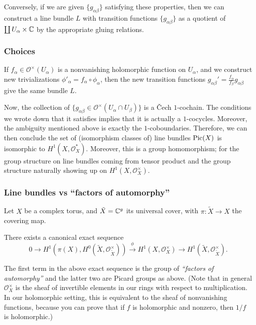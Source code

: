 Conversely, if we are given $\{g_{\alpha\beta}\}$ satisfying these properties, then we can construct a line bundle $L$ with transition functions $\{g_{\alpha\beta}\}$ as a quotient of $\coprod U_\alpha\times {\mathbb C}$ by the appropriate gluing relations. 

\subsubsection{Choices}
If $f_\alpha\in\mathcal{O}^\times(U_\alpha)$ is a nonvanishing holomorphic function on $U_\alpha$, and we construct new trivializations $\phi'_\alpha=f_\alpha\circ \phi_\alpha$, then the new transition functions $g_{\alpha\beta}'=\frac{f_\alpha}{f_\beta}g_{\alpha\beta}$
give the same bundle $L$. 

Now, the collection of $\{g_{\alpha\beta}\in \mathcal{O}^\times (U_\alpha\cap U_\beta)\}$ is a \v{C}ech $1$-cochain. The conditions we wrote down that it satisfies implies that it is actually a $1$-cocycles. Moreover, the ambiguity mentioned above is exactly the $1$-coboundaries. Therefore, we can then conclude the set of (isomorphism classes of) line bundles $\operatorname{Pic}(X)$ is isomorphic to $H^1(X,\mathcal{O}_X^*)$. Moreover, this is a group homomorphism; for the group structure on line bundles coming from tensor product and the group structure naturally showing up on $H^1(X,\mathcal{O}_X^\times)$. 

\subsubsection{Line bundles vs ``factors of automorphy''}
Let $X$ be a complex torus, and $\tilde{X}={\mathbb C}^g$ its universal cover, with $\pi:\tilde{X}\to X$ the covering map. 
\begin{theorem}
There exists a canonical exact sequence 
$$0\to H^1(\pi(X),H^0(\tilde{X},\mathcal{O}_{\tilde{X}}^\times))\overset{\phi}{\to} H^1(X,\mathcal{O}_X^\times)\to H^1(\tilde{X},\mathcal{O}_{\tilde{X}}^\times).$$
\end{theorem}

The first term in the above exact sequence is the group of \emph{``factors of automorphy''} and the latter two are Picard groups as above. (Note that in general $\mathcal{O}_X^\times$ is the sheaf of invertible elements in our rings with respect to multiplication. In our holomorphic setting, this is equivalent to the sheaf of nonvanishing functions, because you can prove that if $f$ is holomorphic and nonzero, then $1/f$ is holomorphic.)

